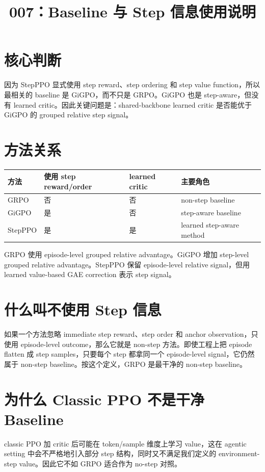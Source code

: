 \documentclass[10pt]{ctexart}
\title{007：Baseline 与 Step 信息使用说明}
\author{}
\date{}
\begin{document}
\maketitle
\vspace{-1.2em}

\section*{核心判断}
因为 StepPPO 显式使用 step reward、step ordering 和 step value function，所以最相关的 baseline 是 GiGPO，而不只是 GRPO。GiGPO 也是 step-aware，但没有 learned critic。因此关键问题是：shared-backbone learned critic 是否能优于 GiGPO 的 grouped relative step signal。

\section*{方法关系}
\begin{center}
\begin{tabular}{llll}
\toprule
方法 & 使用 step reward/order & learned critic & 主要角色 \\
\midrule
GRPO & 否 & 否 & non-step baseline \\
GiGPO & 是 & 否 & step-aware baseline \\
StepPPO & 是 & 是 & learned step-aware method \\
\bottomrule
\end{tabular}
\end{center}
GRPO 使用 episode-level grouped relative advantage。GiGPO 增加 step-level grouped relative advantage。StepPPO 保留 episode-level relative signal，但用 learned value-based GAE correction 表示 step signal。

\section*{什么叫不使用 Step 信息}
如果一个方法忽略 immediate step reward、step order 和 anchor observation，只使用 episode-level outcome，那么它就是 non-step 方法。即使工程上把 episode flatten 成 step samples，只要每个 step 都拿同一个 episode-level signal，它仍然属于 non-step baseline。按这个定义，GRPO 是最干净的 non-step baseline。

\section*{为什么 Classic PPO 不是干净 Baseline}
classic PPO 加 critic 后可能在 token/sample 维度上学习 value，这在 agentic setting 中会不严格地引入部分 step 结构，同时又不满足我们定义的 environment-step value。因此它不如 GRPO 适合作为 no-step 对照。
\end{document}
